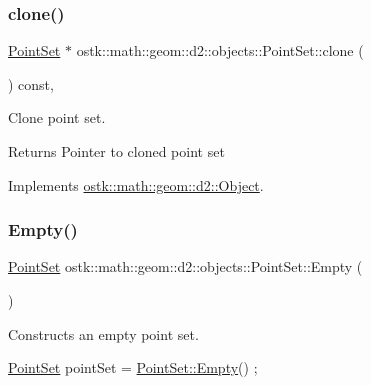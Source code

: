 \subsubsection{\texorpdfstring{clone()}{clone()}}
{\footnotesize\ttfamily \hyperlink{classostk_1_1math_1_1geom_1_1d2_1_1objects_1_1_point_set}{Point\+Set} $\ast$ ostk\+::math\+::geom\+::d2\+::objects\+::\+Point\+Set\+::clone (\begin{DoxyParamCaption}{ }\end{DoxyParamCaption}) const\hspace{0.3cm}{\ttfamily [override]}, {\ttfamily [virtual]}}



Clone point set. 

\begin{DoxyReturn}{Returns}
Pointer to cloned point set 
\end{DoxyReturn}


Implements \hyperlink{classostk_1_1math_1_1geom_1_1d2_1_1_object_a98dedc6792aef35308966ca768eb3e14}{ostk\+::math\+::geom\+::d2\+::\+Object}.

\mbox{\label{classostk_1_1math_1_1geom_1_1d2_1_1objects_1_1_point_set_a09f5e125c7b4545a75e4eea6193bf615}} 
\subsubsection{\texorpdfstring{Empty()}{Empty()}}
{\footnotesize\ttfamily \hyperlink{classostk_1_1math_1_1geom_1_1d2_1_1objects_1_1_point_set}{Point\+Set} ostk\+::math\+::geom\+::d2\+::objects\+::\+Point\+Set\+::\+Empty (\begin{DoxyParamCaption}{ }\end{DoxyParamCaption})\hspace{0.3cm}{\ttfamily [static]}}



Constructs an empty point set. 


\begin{DoxyCode}
\hyperlink{classostk_1_1math_1_1geom_1_1d2_1_1objects_1_1_point_set_a736eff7b0d1c876b304bfa7d1d2d0095}{PointSet} pointSet = \hyperlink{classostk_1_1math_1_1geom_1_1d2_1_1objects_1_1_point_set_a09f5e125c7b4545a75e4eea6193bf615}{PointSet::Empty}() ;
\end{DoxyCode}



